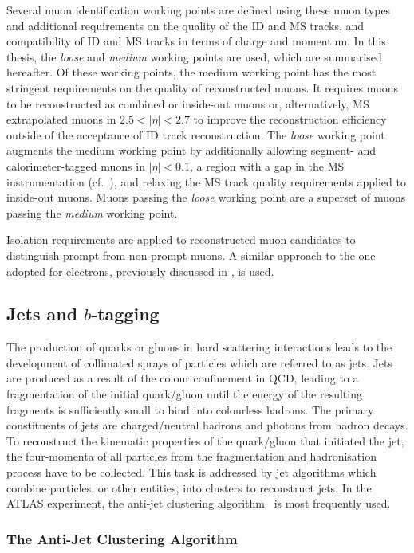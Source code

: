 Several muon identification working points are defined using these muon types
and additional requirements on the quality of the ID and MS tracks, and
compatibility of ID and MS tracks in terms of charge and momentum. In this
thesis, the \emph{loose} and \emph{medium} working points are used, which are
summarised hereafter. Of these working points, the medium working point has the
most stringent requirements on the quality of reconstructed muons. It requires
muons to be reconstructed as combined or inside-out muons or, alternatively, MS
extrapolated muons in $2.5 < |\eta| < 2.7$ to improve the reconstruction
efficiency outside of the acceptance of ID track reconstruction. The
\emph{loose} working point augments the medium working point by additionally
allowing segment- and calorimeter-tagged muons in $|\eta| < 0.1$, a region with
a gap in the MS instrumentation (cf.~), and relaxing the MS
track quality requirements applied to inside-out muons. Muons passing the
\emph{loose} working point are a superset of muons passing the \emph{medium}
working point.

Isolation requirements are applied to reconstructed muon candidates to
distinguish prompt from non-prompt muons. A similar approach to the one adopted
for electrons, previously discussed in , is used.


\subsection{Jets and $b$-tagging}%
\label{sec:jet_rec}

The production of quarks or gluons in hard scattering interactions leads to the
development of collimated sprays of particles which are referred to as
jets. Jets are produced as a result of the colour confinement in QCD, leading to
a fragmentation of the initial quark/gluon until the energy of the resulting
fragments is sufficiently small to bind into colourless hadrons. The primary
constituents of jets are charged/neutral hadrons and photons from hadron
decays. To reconstruct the kinematic properties of the quark/gluon that
initiated the jet, the four-momenta of all particles from the fragmentation and
hadronisation process have to be collected. This task is addressed by jet
algorithms which combine particles, or other entities, into clusters to
reconstruct jets. In the ATLAS experiment, the anti-\kt jet clustering
algorithm~\cite{Cacciari:2008gp} is most frequently used.


\subsubsection{The Anti-\kt Jet Clustering Algorithm}

